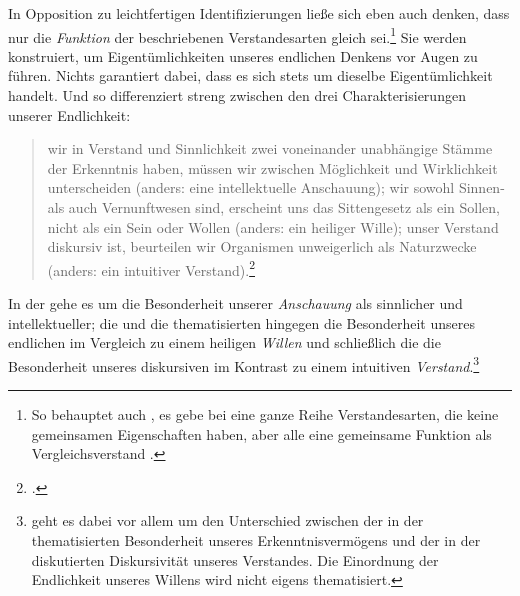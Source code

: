 In Opposition zu leichtfertigen Identifizierungen ließe sich eben auch denken,
dass nur die \emph{Funktion} der beschriebenen Verstandesarten gleich
sei.\footnote{So behauptet auch
, es
gebe bei  eine ganze Reihe 
Verstandesarten, die keine gemeinsamen Eigenschaften haben, aber alle eine
gemeinsame Funktion als Vergleichsverstand
\parencite[vgl.][\pno~153\,f.]{McLaughlin:KantsKritikderteleologischenUrteilskraft1989}.}
Sie werden konstruiert, um Eigentümlichkeiten unseres endlichen Denkens vor Augen zu führen.
Nichts garantiert dabei, dass es sich stets um dieselbe Eigentümlichkeit handelt. 
Und so differenziert  streng
zwischen den drei Charakterisierungen unserer Endlichkeit:
\begin{quote}
 wir in Verstand und Sinnlichkeit zwei voneinander unabhängige Stämme der
Erkenntnis haben, müssen wir zwischen Möglichkeit und Wirklichkeit unterscheiden
(anders: eine intellektuelle Anschauung);  wir sowohl Sinnen- als auch
Vernunftwesen sind, erscheint uns das Sittengesetz als ein Sollen, nicht als ein
Sein oder Wollen (anders: ein heiliger Wille);  unser Verstand diskursiv
ist, beurteilen wir Organismen unweigerlich als Naturzwecke (anders: ein
intuitiver Verstand).\footcite[][153]{Foerster:Die25JahrederPhilosophie2011}
\end{quote}
In der  gehe es um die Besonderheit unserer
\emph{Anschauung} als sinnlicher und intellektueller; die  und die 
thematisierten hingegen die Besonderheit unseres endlichen im Vergleich zu einem
heiligen \emph{Willen} und schließlich die  die
Besonderheit unseres diskursiven im Kontrast zu einem intuitiven
\emph{Verstand}.\footnote{
geht es dabei vor allem um den Unterschied zwischen der in der  thematisierten Besonderheit unseres Erkenntnisvermögens und der
in der  diskutierten Diskursivität unseres
Verstandes. Die Einordnung der Endlichkeit unseres Willens wird nicht eigens
thematisiert.}
